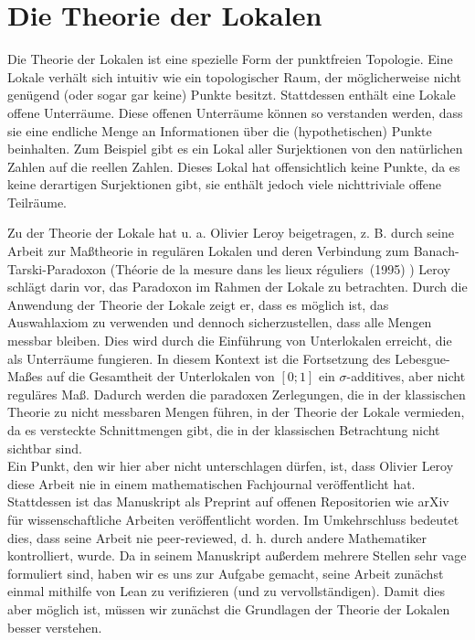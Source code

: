 \documentclass{article}
\begin{document}
\section{Die Theorie der Lokalen}
\noindent Die Theorie der Lokalen ist eine spezielle Form der punktfreien Topologie. Eine Lokale \autocite{nlab_lokal} verhält sich intuitiv wie ein topologischer Raum, der möglicherweise nicht genügend (oder sogar gar keine) Punkte besitzt. Stattdessen enthält eine Lokale offene Unterräume. Diese offenen Unterräume können so verstanden werden, dass sie eine endliche Menge an Informationen über die (hypothetischen) Punkte beinhalten. Zum Beispiel gibt es ein Lokal aller Surjektionen von den natürlichen Zahlen auf die reellen Zahlen. Dieses Lokal hat offensichtlich keine Punkte, da es keine derartigen Surjektionen gibt, sie enthält jedoch viele nichttriviale offene Teilräume.

\noindent Zu der Theorie der Lokale hat u. a.  Olivier Leroy beigetragen, z. B. durch seine Arbeit zur Maßtheorie in regulären Lokalen und deren Verbindung zum Banach-Tarski-Paradoxon (\glqq Théorie de la mesure dans les lieux réguliers\grqq~(1995) \autocite{leroy_theorie_2013}) Leroy schlägt darin vor, das Paradoxon im Rahmen der Lokale zu betrachten. 
Durch die Anwendung der Theorie der Lokale zeigt er, dass es möglich ist, das Auswahlaxiom zu verwenden und dennoch sicherzustellen, dass alle Mengen messbar bleiben. Dies wird durch die Einführung von Unterlokalen erreicht, die als Unterräume fungieren. In diesem Kontext ist die Fortsetzung des Lebesgue-Maßes auf die Gesamtheit der Unterlokalen von $[0;1]$ ein $\sigma$-additives, aber nicht reguläres Maß. Dadurch werden die paradoxen Zerlegungen, die in der klassischen Theorie zu nicht messbaren Mengen führen, in der Theorie der Lokale vermieden, da es versteckte Schnittmengen gibt, die in der klassischen Betrachtung nicht sichtbar sind.\\

\noindent Ein Punkt, den wir hier aber nicht unterschlagen dürfen, ist, dass Olivier Leroy diese Arbeit nie in einem mathematischen Fachjournal veröffentlicht hat. Stattdessen ist das Manuskript als Preprint auf offenen Repositorien wie arXiv für wissenschaftliche Arbeiten veröffentlicht worden. Im Umkehrschluss bedeutet dies, dass seine Arbeit nie peer-reviewed, d. h. durch andere Mathematiker kontrolliert, wurde. Da in seinem Manuskript außerdem mehrere Stellen sehr vage formuliert sind, haben wir es uns zur Aufgabe gemacht, seine Arbeit zunächst einmal mithilfe von Lean zu verifizieren (und zu vervollständigen). Damit dies aber möglich ist, müssen wir zunächst die Grundlagen der Theorie der Lokalen besser verstehen.
\end{document}
